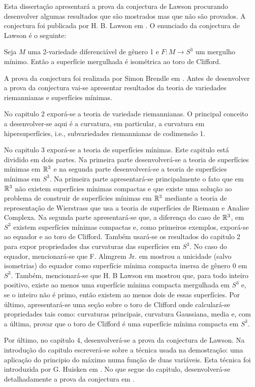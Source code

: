 Esta dissertação apresentará a prova da conjectura de Lawson procurando desenvolver algumas resultados que são mostrados mas que não são provados. A conjectura foi publicada por H. B. Lawson em \cite{Lawson1970a}.
O enunciado da conjectura de Lawson é o seguinte:
\begin{teorema}\label{teo:Lawson}
	Seja
	$M$ uma 2-variedade diferenciável de gênero 1 e
	$F:M \rightarrow S^3$ um mergulho mínimo.
	Então a superfície mergulhada é isométrica ao toro de Clifford.
\end{teorema}
A prova da conjectura foi realizada por Simon Brendle em \cite{Brendle2013a}.
Antes de desenvolver a prova da conjectura vai-se apresentar resultados da teoria de variedades riemannianas e superfícies mínimas.

No capitulo 2 exporá-se a teoria de variedade riemannianas. O principal conceito a desenvolver-se aqui é a curvatura, em particular, a curvatura em hipersuperfícies, i.e., subvariedades riemannianas de codimensão 1.

No capitulo 3 exporá-se a teoria de superfícies mínimas. Este capitulo está dividido em dois partes. Na primeira parte desenvolverá-se a teoria de superfícies mínimas em $\mathbb R^3$ e na segunda parte desenvolverá-se a teoria de superfícies mínimas em $S^3$. Na primeira parte apresentará-se principalmente o fato que em $\mathbb R^3$ não existem superfícies mínimas compactas e que existe uma solução ao problema de construir de superfícies mínimas em $\mathbb R^3$ mediante a teoria de representação de Wierstrass que usa a teoria de superfícies de Riemann e Analise Complexa. Na segunda parte apresentará-se que, a diferença do caso de $\mathbb R^3$, em $S^3$ existem superfícies mínimas compactas e, como primeiros exemplos, exporá-se ao equador e ao toro de Clifford. 
Também usará-se os resultados do capitulo 2 para expor propriedades das curvaturas das superfícies em $S^3$.
No caso do equador, mencionará-se que F. Almgrem Jr. em \cite{Almgren1966} mostrou a unicidade (salvo isometrias) do equador como superfície mínima compacta imersa de gênero 0 em $S^3$. 
Também, mencionará-se que H. B Lawson em \cite{Lawson1970} mostrou que, para todo inteiro positivo, existe ao menos uma superfície mínima compacta mergulhada em $S^3$ e, se o inteiro não é primo, então existem ao menos dois de essas superfícies.
Por último, apresentará-se uma seção sobre o toro de Clifford onde calculará-se propriedades tais como: curvaturas principais, curvatura Gaussiana, media e, com a última, provar que o toro de Clifford é uma superfície mínima compacta em $S^3$. 

Por último, no capitulo 4, desenvolverá-se a prova da conjectura de Lawson.
Na introdução do capitulo escreverá-se sobre a técnica usada na demostração: uma aplicação do principio do máximo numa função de duas variáveis.
Esta técnica foi introduzida por G. Huisken em \cite{Huisken1998}.
No que segue do capitulo, desenvolverá-se detalhadamente a prova da conjectura em \cite{Brendle2013a}.